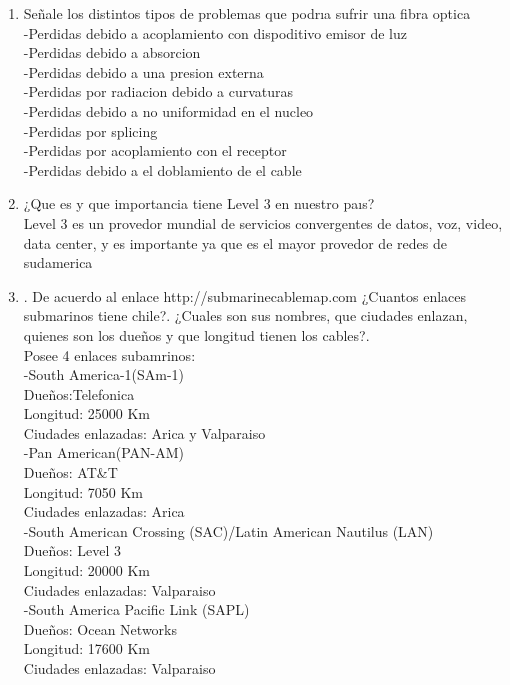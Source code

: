 \documentclass{udparticle}
\begin{document}
\begin{enumerate}
  \item Señale los distintos tipos de problemas que podrıa sufrir una ﬁbra optica\\
  -Perdidas debido a acoplamiento con dispoditivo emisor de luz\\
  -Perdidas debido a absorcion\\
  -Perdidas debido a una presion externa\\
  -Perdidas por radiacion debido a curvaturas \\
  -Perdidas debido a no uniformidad en el nucleo\\
  -Perdidas por splicing\\
  -Perdidas por acoplamiento con el receptor\\
  -Perdidas debido a el doblamiento de el cable\\
  \item ¿Que es y que importancia tiene Level 3 en nuestro paıs?\\
  Level 3 es un provedor mundial de servicios convergentes de datos, voz, video, data center, y es importante ya que es el mayor provedor de redes de sudamerica\\
  \item . De acuerdo al enlace http://submarinecablemap.com ¿Cuantos enlaces submarinos tiene chile?.
¿Cuales son sus nombres, que ciudades enlazan, quienes son los dueños y que longitud tienen
los cables?.\\
Posee 4 enlaces subamrinos:\\
-South America-1(SAm-1)\\
Dueños:Telefonica\\
Longitud: 25000 Km\\
Ciudades enlazadas: Arica y Valparaiso\\
-Pan American(PAN-AM)\\
Dueños: AT&T\\
Longitud: 7050 Km\\
Ciudades enlazadas: Arica\\
-South American Crossing (SAC)/Latin American Nautilus (LAN)\\
Dueños: Level 3\\
Longitud: 20000 Km\\
Ciudades enlazadas: Valparaiso\\
-South America Pacific Link (SAPL)\\
Dueños: Ocean Networks\\
Longitud: 17600 Km\\
Ciudades enlazadas: Valparaiso\\ 

\end{enumerate}
\end{document}
